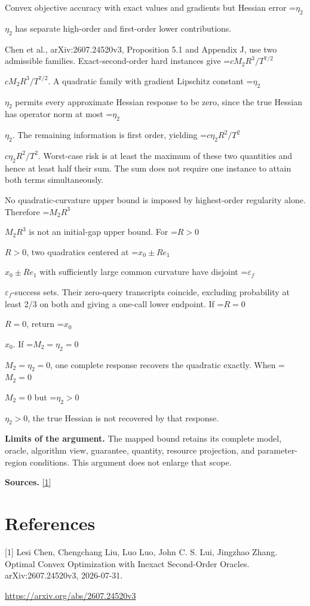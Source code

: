 \documentclass[10pt,a4paper]{article}
\newcommand{\AtlasMath}[1]{\par\begingroup\centering\setbox0=\hbox{$\displaystyle #1$}\ifdim\wd0>1.4\linewidth\typeout{ATLAS WIDE FORMULA: \the\wd0}\fi\ifdim\wd0>\linewidth\resizebox{\linewidth}{!}{\box0}\else\box0\fi\par\endgroup}
\newcommand{\AtlasInlineMath}[1]{\begingroup\setbox0=\hbox{$#1$}\ifdim\wd0>.4\linewidth\endgroup\AtlasMath{#1}\else\endgroup$#1$\fi}
\begin{document}
Convex objective accuracy with exact values and gradients but Hessian error \AtlasInlineMath{\eta_2} has separate high-order and first-order lower contributions.

Chen et al., arXiv:2607.24520v3, Proposition 5.1 and Appendix J, use two admissible families. Exact-second-order hard instances give \AtlasInlineMath{cM_2R^3/T^{7/2}}. A quadratic family with gradient Lipschitz constant \AtlasInlineMath{\eta_2} permits every approximate Hessian response to be zero, since the true Hessian has operator norm at most \AtlasInlineMath{\eta_2}. The remaining information is first order, yielding \AtlasInlineMath{c\eta_2R^2/T^2}. Worst-case risk is at least the maximum of these two quantities and hence at least half their sum. The sum does not require one instance to attain both terms simultaneously.

No quadratic-curvature upper bound is imposed by highest-order regularity alone. Therefore \AtlasInlineMath{M_2R^3} is not an initial-gap upper bound. For \AtlasInlineMath{R>0}, two quadratics centered at \AtlasInlineMath{x_0\pm R e_1} with sufficiently large common curvature have disjoint \AtlasInlineMath{\varepsilon_f}-success sets. Their zero-query transcripts coincide, excluding probability at least 2/3 on both and giving a one-call lower endpoint. If \AtlasInlineMath{R=0}, return \AtlasInlineMath{x_0}. If \AtlasInlineMath{M_2=\eta_2=0}, one complete response recovers the quadratic exactly. When \AtlasInlineMath{M_2=0} but \AtlasInlineMath{\eta_2>0}, the true Hessian is not recovered by that response.

\textbf{Limits of the argument.} The mapped bound retains its complete model, oracle, algorithm view, guarantee, quantity, resource projection, and parameter-region conditions. This argument does not enlarge that scope.

\textbf{Sources.} \href{https://arxiv.org/abs/2607.24520v3}{[1]}

\section{References}
[1] Lesi Chen, Chengchang Liu, Luo Luo, John C. S. Lui, Jingzhao Zhang. Optimal Convex Optimization with Inexact Second-Order Oracles. arXiv:2607.24520v3, 2026-07-31.

\url{https://arxiv.org/abs/2607.24520v3}
\end{document}
